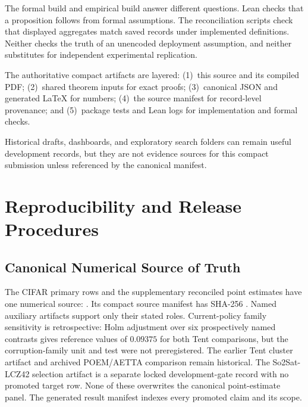 The formal build and empirical build answer different questions. Lean checks that a proposition
follows from formal assumptions. The reconciliation scripts check that displayed aggregates match
saved records under implemented definitions. Neither checks the truth of an unencoded deployment
assumption, and neither substitutes for independent experimental replication.

The authoritative compact artifacts are layered: (1)~this source and its compiled PDF; (2)~shared theorem inputs for exact proofs; (3)~canonical JSON and generated LaTeX for numbers; (4)~the source manifest for record-level provenance; and (5)~package tests and Lean logs for implementation and formal checks.

Historical drafts, dashboards, and exploratory search folders can remain useful development
records, but they are not evidence sources for this compact submission unless referenced by the
canonical manifest.

\section{Reproducibility and Release Procedures}
\label{sec:compact-repro}

\subsection{Canonical Numerical Source of Truth}

The CIFAR primary rows and the supplementary reconciled point estimates have one numerical source:
. Its compact
source manifest has SHA-256 \hashtext{\SourceManifestSHA}. Named auxiliary artifacts support only
their stated roles. Current-policy family sensitivity is retrospective: Holm adjustment over six
prospectively named contrasts gives reference values of $0.09375$ for both Tent comparisons, but
the corruption-family unit and test were not preregistered. The earlier Tent cluster artifact and
archived POEM/AETTA comparison remain historical. The So2Sat-LCZ42 selection artifact is a separate locked
development-gate record with no promoted target row. None of these overwrites the canonical
point-estimate panel. The generated result manifest indexes every promoted claim and its scope.

